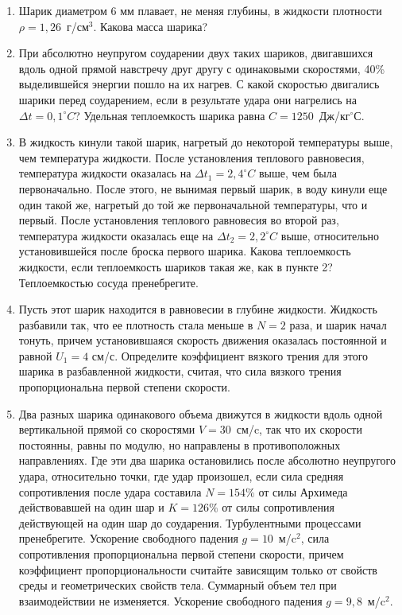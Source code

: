
\begin{enumerate}
    \item Шарик диаметром 6 мм плавает, не меняя глубины, в жидкости плотности $\rho=1,26$~г/см$^3$. Какова масса шарика?
    \item При абсолютно неупругом соударении двух таких шариков, двигавшихся вдоль одной прямой навстречу друг другу с одинаковыми скоростями, 
    40\% выделившейся энергии пошло на их нагрев. С какой скоростью двигались шарики перед соударением, если в результате удара они нагрелись на 
    $\Delta t = 0,1^{\circ}C$? Удельная теплоемкость шарика равна $C=1250$~Дж/кг$^{\circ}$С.
    \item В жидкость кинули такой шарик, нагретый до некоторой температуры выше, чем температура жидкости. После установления теплового 
    равновесия, температура жидкости оказалась на $\Delta t_1 = 2,4^{\circ}C$ выше, чем была первоначально. После этого, не вынимая первый 
    шарик, в воду кинули еще один такой же, нагретый до той же первоначальной температуры, что и первый. После установления теплового 
    равновесия во второй раз, температура жидкости оказалась еще на $\Delta t_2 = 2,2^{\circ}C$ выше, относительно установившейся 
    после броска первого шарика. Какова теплоемкость жидкости, если теплоемкость шариков такая же, как в пункте 2? 
    Теплоемкостью сосуда пренебрегите.
    \item Пусть этот шарик находится в равновесии в глубине жидкости. Жидкость разбавили так, что ее плотность 
    стала меньше в $N = 2$ раза, и шарик начал тонуть, причем установившаяся скорость движения оказалась постоянной и равной $U_1 = 4$ см/с. Определите коэффициент вязкого трения для этого шарика в разбавленной жидкости, 
    считая, что сила вязкого трения пропорциональна первой степени скорости.
    \item Два разных шарика одинакового объема движутся в жидкости вдоль одной вертикальной прямой со скоростями 
    $V = 30$~см/c, так что их скорости постоянны, равны по модулю, но направлены в противоположных направлениях. 
    Где эти два шарика остановились после абсолютно неупругого удара, относительно точки, где удар произошел, 
    если сила средняя сопротивления после удара составила $N = 154\%$ от силы Архимеда действовавшей на один шар и 
    $K = 126\%$ от силы сопротивления действующей на один шар до соударения. Турбулентными процессами пренебрегите. 
    Ускорение свободного падения $g = 10$~м/c$^2$, сила сопротивления пропорциональна первой степени скорости, 
    причем коэффициент пропорциональности считайте зависящим только от свойств среды и геометрических свойств 
    тела. Суммарный объем тел при взаимодействии не изменяется. Ускорение свободного падения $g=9,8$~м/c$^2$.   
\end{enumerate}
